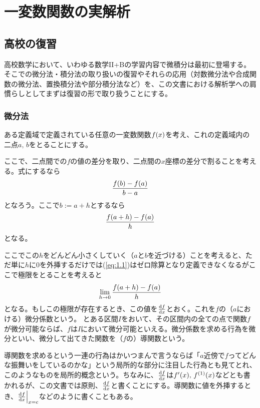 \chapter{一変数関数の実解析}
\section{高校の復習}
高校数学において、いわゆる数学II+Bの学習内容で微積分は最初に登場する。そこでの微分法・積分法の取り扱いの復習やそれらの応用（対数微分法や合成関数の微分法、置換積分法や部分積分法など）を、この文書における解析学への肩慣らしとしてまずは復習の形で取り扱うことにする。
\subsection{微分法}
ある定義域で定義されている任意の一変数関数$f\pare{x}$を考え、これの定義域内の二点$a,\,b$をとることにする。

ここで、二点間での$f$の値の差分を取り、二点間の$x$座標の差分で割ることを考える。式にするなら
\begin{align*}
    \frac{f\pare{b}-f\pare{a}}{b-a}
\end{align*}
となろう。ここで$b:=a+h$とするなら
\begin{align}
    \frac{f\pare{a+h}-f\pare{a}}{h}\label{eq:1.1}
\end{align}
となる。

ここでこの$h$をどんどん小さくしていく（$a$と$b$を近づける）ことを考えると、ただ単に$h$に0を外挿するだけでは(\ref{eq:1.1})はゼロ除算となり定義できなくなるがここで極限をとることを考えると
\begin{align}
    \lim_{h\to 0}\frac{f\pare{a+h}-f\pare{a}}{h}\label{eq:1.2}
\end{align}
となる。もしこの極限が存在するとき、この値を$\frac{\mathrm{d}f}{\mathrm{d}x}$とおく。これを$f$の（$a$における）微分係数という。
とある区間$I$をおいて、その区間内の全ての点で関数$f$が微分可能ならば、$f$は$I$において微分可能といえる。微分係数を求める行為を微分といい、微分して出てきた関数を（$f$の）導関数という。

導関数を求めるという一連の行為はかいつまんで言うならば「$a$近傍で$f$ってどんな振舞いをしているのかな」という局所的な部分に注目した行為とも見てとれ、このようなものを局所的概念という。ちなみに、$\frac{\mathrm{d}f}{\mathrm{d}x}$は$f'\pare{x},\,f^{\pare{1}}\pare{x}$などとも書かれるが、この文書では原則、$\frac{\mathrm{d}f}{\mathrm{d}x}$と書くことにする。導関数に値を外挿するとき、$\frac{\mathrm{d}f}{\mathrm{d}x}\Big|_{x=c}$などのように書くこともある。
